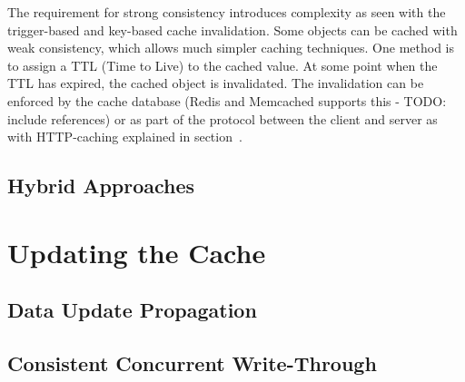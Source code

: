 The requirement for strong consistency introduces complexity as seen with the trigger-based and key-based cache invalidation. Some objects can be cached with weak consistency, which allows much simpler caching techniques. One method is to assign a TTL (Time to Live) to the cached value. At some point when the TTL has expired, the cached object is invalidated. The invalidation can be enforced by the cache database (Redis and Memcached supports this - TODO: include references) or as part of the protocol between the client and server as with HTTP-caching explained in section~\cite{paper:web-caching-schemes}.


\subsection{Hybrid Approaches}
\label{subsec:hybrid_approaches}



\section{Updating the Cache}
\label{sec:updating_the_cache}

\subsection{Data Update Propagation}
\label{subsec:data_update_propagation}



\subsection{Consistent Concurrent Write-Through}
\label{subsec:consistent_concurrent_write_through}


